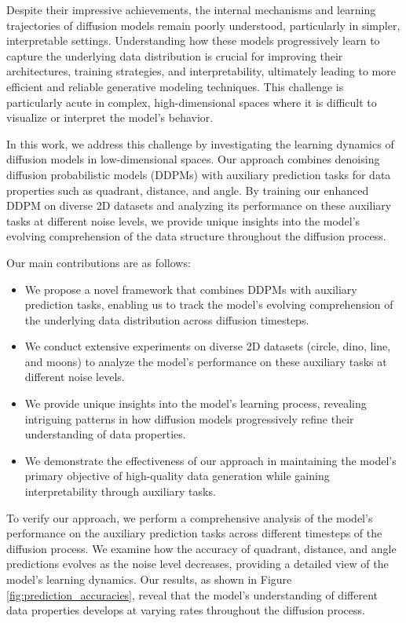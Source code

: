 \documentclass{article} %
\begin{document}
Despite their impressive achievements, the internal mechanisms and learning trajectories of diffusion models remain poorly understood, particularly in simpler, interpretable settings. Understanding how these models progressively learn to capture the underlying data distribution is crucial for improving their architectures, training strategies, and interpretability, ultimately leading to more efficient and reliable generative modeling techniques. This challenge is particularly acute in complex, high-dimensional spaces where it is difficult to visualize or interpret the model's behavior.

In this work, we address this challenge by investigating the learning dynamics of diffusion models in low-dimensional spaces. Our approach combines denoising diffusion probabilistic models (DDPMs) with auxiliary prediction tasks for data properties such as quadrant, distance, and angle. By training our enhanced DDPM on diverse 2D datasets and analyzing its performance on these auxiliary tasks at different noise levels, we provide unique insights into the model's evolving comprehension of the data structure throughout the diffusion process.

Our main contributions are as follows:
\begin{itemize}
    \item We propose a novel framework that combines DDPMs with auxiliary prediction tasks, enabling us to track the model's evolving comprehension of the underlying data distribution across diffusion timesteps.
    \item We conduct extensive experiments on diverse 2D datasets (circle, dino, line, and moons) to analyze the model's performance on these auxiliary tasks at different noise levels.
    \item We provide unique insights into the model's learning process, revealing intriguing patterns in how diffusion models progressively refine their understanding of data properties.
    \item We demonstrate the effectiveness of our approach in maintaining the model's primary objective of high-quality data generation while gaining interpretability through auxiliary tasks.
\end{itemize}

To verify our approach, we perform a comprehensive analysis of the model's performance on the auxiliary prediction tasks across different timesteps of the diffusion process. We examine how the accuracy of quadrant, distance, and angle predictions evolves as the noise level decreases, providing a detailed view of the model's learning dynamics. Our results, as shown in Figure \ref{fig:prediction_accuracies}, reveal that the model's understanding of different data properties develops at varying rates throughout the diffusion process.
\end{document}
